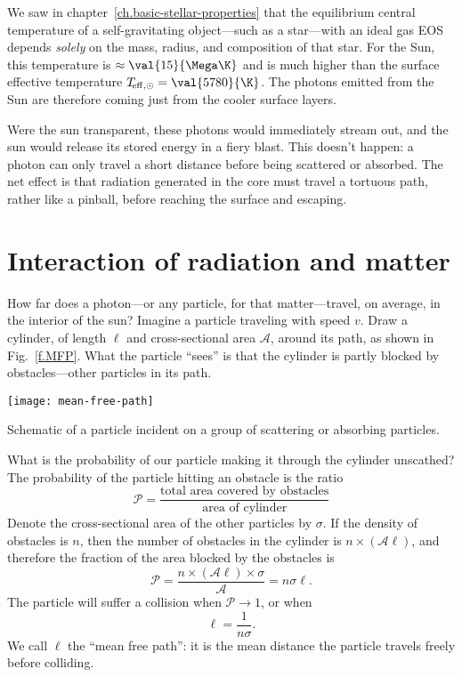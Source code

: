 
We saw in chapter~\ref{ch.basic-stellar-properties} that the equilibrium central temperature of a self-gravitating object---such as a star---with an ideal gas EOS depends \emph{solely} on the mass, radius, and composition of that star. For the Sun, this temperature is $\approx \val{15}{\Mega\K}$ and is much higher than the surface effective temperature $T_{\!\mathrm{eff,\odot}} = \val{5780}{\K}$. The photons emitted from the Sun are therefore coming just from the cooler surface layers.

  Were the sun transparent, these photons would immediately stream out, and the sun would release its stored energy in a fiery blast.  This doesn't happen: a photon can only travel a short distance before being scattered or absorbed. The net effect is that radiation generated in the core must travel a tortuous path, rather like a pinball, before reaching the surface and escaping.

\section{Interaction of radiation and matter}\label{s.interaction-radiation-matter}

How far does a photon---or any particle, for that matter---travel, on average, in the interior of the sun? Imagine a particle traveling with speed $v$.  Draw a cylinder, of length $\ell$ and cross-sectional area $\mathcal{A}$, around its path, as shown in Fig.~\ref{f.MFP}. What the particle ``sees'' is that the cylinder is partly blocked by obstacles---other particles in its path.
\begin{marginfigure}
    \texttt{[image: mean-free-path]}
    \caption[Schematic of mean free path]{\label{f.MFP} Schematic of a particle incident on a group of scattering or absorbing particles.}
\end{marginfigure}
What is the probability of our particle making it through the cylinder unscathed? The probability of the particle hitting an obstacle is the ratio
\[
    \mathcal{P} = \frac{\textrm{total area covered by obstacles}}{\textrm{area of cylinder}}
\]
Denote the cross-sectional area of the other particles by $\sigma$. If the density of obstacles is $n$, then the number of obstacles in the cylinder is $n\times(\mathcal{A}\ell)$, and therefore the fraction of the area blocked by the obstacles is
\begin{equation}
    \mathcal{P} = \frac{n\times(\mathcal{A}\ell)\times\sigma}{\mathcal{A}} = n\sigma\ell.
\label{e.prob-MFP}
\end{equation}
The particle will suffer a collision when $\mathcal{P}\to 1$, or when
\begin{equation}\label{e.MFP}
    \ell = \frac{1}{n\sigma}.
\end{equation}
We call $\ell$ the ``mean free path'': it is the mean distance the particle travels freely before colliding.

